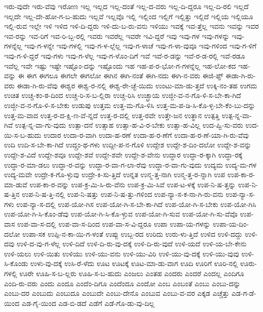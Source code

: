 {ಇರು-ವುದೇ
ಇರು-ವೆವು
ಇರೋಣ
ಇಲ್ಲ
ಇಲ್ಲದ
ಇಲ್ಲ-ದಂತೆ
ಇಲ್ಲ-ದ-ವರು
ಇಲ್ಲ-ದಿ-ದ್ದರೂ
ಇಲ್ಲ-ದಿ-ರಲಿ
ಇಲ್ಲದೆ
ಇಲ್ಲದೇ
ಇಲ್ಲ-ದೇ-ಹೋ-ಗ-ಬ-ಹುದು
ಇಲ್ಲವೆ
ಇಲ್ಲವೊ
ಇಲ್ಲಿ
ಇಲ್ಲಿಂದ
ಇಲ್ಲಿಗೆ
ಇಲ್ಲಿತ್ತು
ಇಲ್ಲಿದೆ
ಇಲ್ಲಿಯ
ಇಲ್ಲಿಯೂ
ಇಲ್ಲಿ-ರುವ
ಇಲ್ಲೇ
ಇಳಿ
ಇಳಿದ
ಇಳಿ-ದಿ-ದ್ದರು
ಇಳಿ-ದು-ಬ-ರು-ವನು
ಇಳಿಯು
ಇವಕ್ಕೆ
ಇವ-ತ್ತೆಲ್ಲ
ಇವನು
ಇವನ್ನು
ಇವರ
ಇವ-ರನ್ನು
ಇವ-ರಿಗೆ
ಇವ-ರಿ-ಬ್ಬ-ರಲ್ಲಿ
ಇವರು
ಇವರೆಲ್ಲ
ಇವರೇ
ಇವಿ-ದ್ದರೆ
ಇವು
ಇವು-ಗಳ
ಇವು-ಗಳನ್ನು
ಇವು-ಗಳನ್ನೆಲ್ಲ
ಇವು-ಗ-ಳನ್ನೇ
ಇವು-ಗಳಲ್ಲಿ
ಇವು-ಗ-ಳ-ಲ್ಲೆಲ್ಲ
ಇವು-ಗ-ಳಾಚೆ
ಇವು-ಗ-ಳಾ-ವುವೂ
ಇವು-ಗಳಿಂದ
ಇವು-ಗ-ಳಿಗೆ
ಇವು-ಗ-ಳಿ-ದ್ದರೆ
ಇವು-ಗಳು
ಇವು-ಗ-ಳೆಲ್ಲ
ಇವು-ಗ-ಳೊಂ-ದಿಗೆ
ಇವೆ
ಇವೆ-ರ-ಡನ್ನು
ಇವೆ-ರ-ಡ-ರಲ್ಲಿ
ಇವೆ-ರಡೂ
ಇವೆಲ್ಲ
ಇವೇ
ಇಷ್ಟು
ಇಷ್ಟೇ
ಇಷ್ಟೊಂ-ದನ್ನು
ಇಷ್ಟೊಂದು
ಇಹ
ಇಹ-ಪ-ರ-ಭೋ-ಗ-ಗಳನ್ನೆಲ್ಲ
ಇಹ-ಲೋ-ಕದ
ಇಹ-ವನ್ನು
ಈ
ಈಗ
ಈಗಲೂ
ಈಗಲೇ
ಈಗಲೋ
ಈಗಿನ
ಈಗಿ-ನಂತೆ
ಈಗಿ-ನದು
ಈಗಿ-ನ-ವರು
ಈಜಿ-ಪ್ಟ್
ಈಡಾ-ಗಿ-ರು-ವರು
ಈಡಾ-ಗಿ-ರು-ವೆವು
ಈಶ್ವರ
ಈಶ್ವ-ರ-ನಲ್ಲಿ
ಈಶ್ವ-ರೇ-ಚ್ಛೆ-ಯಿದು
ಉಂಟು-ಮಾ-ಡು-ತ್ತದೆ
ಉಕ್ಕಿ-ನಂ-ತಹ
ಉಗಮ
ಉಚಿತ
ಉಚ್ಚ-ಕಂ-ಠ-ದಿಂದ
ಉಚ್ಚ-ರಿ-ಸ-ಬ-ಲ್ಲಿರಾ
ಉಚ್ಚ-ರಿಸಿ
ಉಚ್ಛ್ರಾಯ
ಉಜ್ಜೀ-ವ-ನ-ಗೊ-ಳಿ-ಸ-ಬೇ-ಕಾ-ಗಿದೆ
ಉಜ್ಜೀ-ವ-ನ-ಗೊ-ಳಿ-ಸ-ಬೇಕು
ಉಡುಪು
ಉತ್ತಮ
ಉತ್ತ-ಮ-ಗೊ-ಳಿಸಿ
ಉತ್ತ-ಮ-ಪ-ಡಿ-ಸಿ-ಕೊ-ಳ್ಳ-ಬೇ-ಕೆಂ-ಬು-ದನ್ನು
ಉತ್ತ-ಮ-ವಾದ
ಉತ್ತ-ರ-ದ-ಕ್ಷಿ-ಣ-ವೆ-ನ್ನದೆ
ಉತ್ತ-ರ-ದಲ್ಲಿ
ಉತ್ತ-ರವೇ
ಉತ್ತೇ-ಜನ
ಉತ್ಥಾನ
ಉತ್ಪತ್ತಿ
ಉತ್ಪ-ನ್ನ-ವಾ-ಗಿವೆ
ಉತ್ಪ-ನ್ನ-ವಾ-ಗು-ವುದು
ಉತ್ಪಾ-ದನೆ
ಉತ್ಸಾಹ
ಉತ್ಸಾ-ಹ-ವಿ-ರ-ಬೇಕು
ಉತ್ಸಾ-ಹ-ವಿಲ್ಲ
ಉದ-ಪ್ವಿ-ಸು-ವರು
ಉದ-ಯಿ-ಸ-ಬ-ಹುದು
ಉದಾರ
ಉದಾ-ರ-ವಾಗಿ
ಉದಾ-ಹ-ರಣೆ
ಉದಾ-ಹ-ರ-ಣೆಗೆ
ಉದಾ-ಹ-ರ-ಣೆ-ಯಾ-ಗಿ-ರು-ವೆವು
ಉದಿ
ಉದಿ-ಸ-ಬೇ-ಕಾ-ಗಿದೆ
ಉದ್ಗ್ರಂ-ಥ-ಗಳು
ಉದ್ದೀ-ಪ-ನ-ಗೊಳಿ
ಉದ್ದೇಶ
ಉದ್ದೇ-ಶ-ದಿಂ-ದಲೋ
ಉದ್ದೇ-ಶ-ವನ್ನು
ಉದ್ದೇ-ಶ-ವಿದೆ
ಉದ್ದೇ-ಶವೂ
ಉದ್ದೇ-ಶವೆ
ಉದ್ದೇ-ಶವೇ
ಉದ್ದೇ-ಶ-ವೇನು
ಉದ್ಧಾರ
ಉದ್ಧಾ-ರ-ಕ್ಕಾಗಿ
ಉದ್ಧಾ-ರಕ್ಕೆ
ಉದ್ಧಾ-ರ-ಮಾ-ಡಲು
ಉದ್ಧಾ-ರ-ವನ್ನು
ಉದ್ಧಾ-ರ-ವಾ-ಗ-ಲಾ-ರೆವು
ಉದ್ಧಾ-ರ-ವಾ-ಗು-ವುದು
ಉದ್ಯಮ
ಉದ್ಯ-ಮ-ಗಳ
ಉದ್ಯ-ಮವೇ
ಉದ್ರೇ-ಕ-ಗೊ-ಳ್ಳುವು
ಉದ್ರೇ-ಕಿ-ಸು-ತ್ತಿದೆ
ಉನ್ನತ
ಉನ್ಮ-ತ್ತ-ನಾಗಿ
ಉನ್ಮ-ತ್ತ-ರ-ನ್ನಾಗಿ
ಉಪ
ಉಪ-ಕಾ-ರ-ಮಾ-ಡುವೆ
ಉಪ-ಕಾ-ರ-ವನ್ನು
ಉಪ-ಕ್ರ-ಮಿ-ಸಿ-ರು-ವೆನು
ಉಪ-ಕ್ರ-ಮಿ-ಸಿವೆ
ಉಪ-ಟ-ಳಕ್ಕೆ
ಉಪ-ನಿ-ಷ-ತ್ತನ್ನು
ಉಪ-ನಿ-ಷ-ತ್ತಿನ
ಉಪ-ನಿ-ಷ-ತ್ತಿ-ನಲ್ಲಿ
ಉಪ-ನಿ-ಷತ್ತು
ಉಪ-ನಿ-ಷ-ತ್ತು-ಗಳಿಂದ
ಉಪ-ನ್ಯಾ-ಸ-ಕ-ನಾ-ಗಿ-ರು-ವನು
ಉಪ-ನ್ಯಾ-ಸ-ಗಳು
ಉಪ-ನ್ಯಾ-ಸ-ದಲ್ಲಿ
ಉಪ-ಯೋ-ಗಿಸ
ಉಪ-ಯೋ-ಗಿ-ಸ-ಬೇ-ಕಾ-ಗಿದೆ
ಉಪ-ಯೋ-ಗಿ-ಸ-ಬೇಕು
ಉಪ-ಯೋ-ಗಿಸಿ
ಉಪ-ಯೋ-ಗಿ-ಸಿ-ಕೊಂ-ಡೆವು
ಉಪ-ಯೋ-ಗಿ-ಸಿ-ಕೊ-ಳ್ಳುವ
ಉಪ-ಯೋ-ಗಿ-ಸುವ
ಉಪ-ಯೋ-ಗಿ-ಸು-ವೆವೊ
ಉಪ-ವಾಸ
ಉಪ-ವಾ-ಸ-ದಲ್ಲಿ
ಉಪ-ವಾ-ಸ-ದಿಂದ
ಉಪ-ವಾ-ಸ-ವಿ-ದ್ದರೂ
ಉಪಾ
ಉಪಾ-ಯ-ಗಳನ್ನು
ಉಪಾ-ಯ-ದಿಂ-ದಲೋ
ಉಪಾ-ಸಕ
ಉಪ್ಪಿ-ನ-ಕಾ-ಯಿ-ಗ-ಳಂತೆ
ಉಪ್ಪು
ಉಬ್ಬ-ರದ
ಉರಿದು
ಉರು-ಳು-ತ್ತಿದೆ
ಉಳಿದ
ಉಳಿ-ದದ್ದು
ಉಳಿ-ದವು
ಉಳಿ-ದ-ವು-ಗ-ಳೆಲ್ಲ
ಉಳಿ-ದಿದೆ
ಉಳಿ-ದಿ-ರು-ವು-ದಕ್ಕೆ
ಉಳಿ-ದಿ-ರು-ವುದೆ
ಉಳಿ-ಯದೆ
ಉಳಿ-ಯ-ಬೇ-ಕೇನು
ಉಳಿ-ಯಲು
ಉಳಿ-ಯಿತು
ಉಳಿಯು
ಉಳಿ-ಯು-ವನು
ಉಳಿ-ಯು-ವಿರಿ
ಉಳಿ-ಯು-ವು-ದಕ್ಕೆ
ಉಳಿ-ಯು-ವುವು
ಉಳಿ-ಸಿ-ಕೊಂಡು
ಉಳು-ವು-ದಕ್ಕೆ
ಉಸಿ-ರೆ-ಳೆದು
ಊಟ
ಊಟಕ್ಕೆ
ಊಟ-ಮಾ-ಡು-ವಾಗ
ಊದಿ
ಊರಿಗೆ
ಊರಿ-ನಲ್ಲಿ
ಊರು-ಗಳಲ್ಲಿ
ಊರೇ
ಊಹಿ-ಸ-ಬ-ಲ್ಲರು
ಊಹಿ-ಸ-ಬ-ಹುದು
ಎಂಜಲು
ಎಂತಹ
ಎಂದರು
ಎಂದರೆ
ಎಂದಲ್ಲ
ಎಂದಿಗೂ
ಎಂದಿ-ರು-ವರು
ಎಂದು
ಎಂದೂ
ಎಂದೆಂ-ದಿಗೂ
ಎಂದೆಂದೂ
ಎಂದೋ
ಎಂಬ
ಎಂಬಂತೆ
ಎಂಬು
ಎಂಬು-ದನ್ನು
ಎಂಬು-ದರ
ಎಂಬುದು
ಎಂಬುದೂ
ಎಂಬುದೇ
ಎಂಬು-ದೇನೊ
ಎಂಬುವ
ಎಂಬು-ವ-ವರ
ಎಕ್ಕಡ
ಎಚ್ಚೆತ್ತು
ಎಡ-ಗ-ಡೆ-ಯಿಂದ
ಎಡ-ಗೈ-ಯಿಂದ
ಎಡ-ಬಿ-ಡದೆ
ಎಡೆಗೆ
ಎಡೆ-ಗೊ-ಡು-ವು-ದಿಲ್ಲ
}
